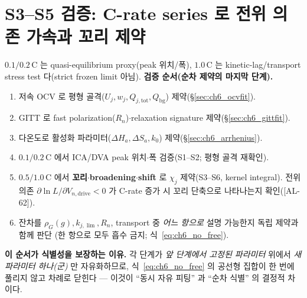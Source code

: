 \documentclass[11pt,a4paper]{article}
\newcommand{\drive}{\mathrm{drive}}
\newcommand{\bg}{\mathrm{bg}}
\newcommand{\tot}{\mathrm{tot}}
\newcommand{\AL}[1]{\textsf{[AL-#1]}}
\begin{document}
\section{S3--S5 검증: C-rate series 로 전위 의존 가속과 꼬리 제약}\label{sec:ch6_crate}
$0.1/0.2\,\mathrm C$ 는 quasi-equilibrium proxy(peak 위치/폭), $1.0\,\mathrm C$ 는 kinetic-lag/transport stress
test 다(strict frozen limit 아님). \textbf{검증 순서(순차 제약의 마지막 단계).}
\begin{enumerate}[label=C\arabic*),leftmargin=2.4em]
\item 저속 OCV 로 평형 골격($U_j,w_j,Q_{j,\tot},Q_\bg$) 제약(\S\ref{sec:ch6_ocvfit}).
\item GITT 로 fast polarization($R_n$)$\cdot$relaxation signature 제약(\S\ref{sec:ch6_gittfit}).
\item 다온도로 활성화 파라미터($\Delta H_a,\Delta S_a,k_0$) 제약(\S\ref{sec:ch6_arrhenius}).
\item $0.1/0.2\,\mathrm C$ 에서 ICA/DVA peak 위치$\cdot$폭 검증(S1--S2; 평형 골격 재확인).
\item $0.5/1.0\,\mathrm C$ 에서 \textbf{꼬리$\cdot$broadening$\cdot$shift} 로 $\chi_j$ 제약(S3--S6, kernel integral).
  전위 의존 $\partial\ln L/\partial V_{n,\drive}<0$ 가 C-rate 증가 시 꼬리 단축으로 나타나는지 확인(\AL{62}).
\item 잔차를 $\rho_G(g),k_{j,\lim},R_n$, transport 중 \emph{어느 항으로} 설명 가능한지 독립 제약과 함께 판단
  (한 항으로 모두 흡수 금지; 식~\eqref{eq:ch6_no_free}).
\end{enumerate}
\textbf{이 순서가 식별성을 보장하는 이유.} 각 단계가 \emph{앞 단계에서 고정된 파라미터} 위에서 \emph{새 파라미터
하나(군)} 만 자유화하므로, 식~\eqref{eq:ch6_no_free} 의 공선형 집합이 한 번에 풀리지 않고 차례로 닫힌다 — 이것이
``동시 자유 피팅'' 과 ``순차 식별'' 의 결정적 차이다.

\end{document}
